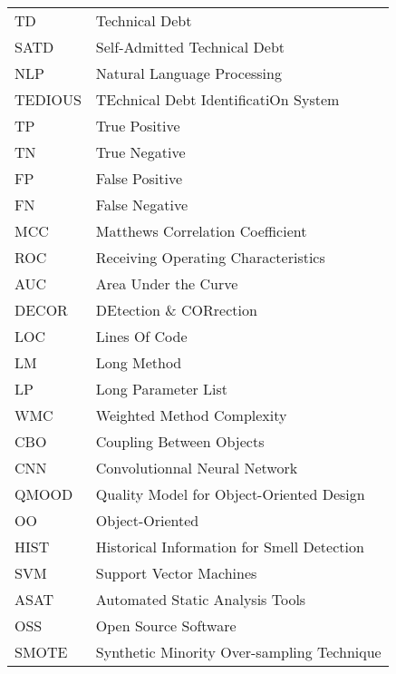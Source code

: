 \begin{longtable}{lp{5in}}
TD			    & Technical Debt\\
SATD		 & Self-Admitted Technical Debt\\
NLP			   & Natural Language Processing\\
TEDIOUS	   & TEchnical Debt IdentificatiOn System\\
TP				& True Positive\\
TN				& True Negative\\
FP				& False Positive\\
FN				& False Negative\\
MCC			  & Matthews Correlation Coefficient\\
ROC			  & Receiving Operating Characteristics\\
AUC			  & Area Under the Curve\\
DECOR	    & DEtection \& CORrection\\
LOC			   & Lines Of Code\\
LM				& Long Method\\
LP				 & Long Parameter List\\
WMC			 & Weighted Method Complexity\\
CBO			  & Coupling Between Objects\\
CNN			  & Convolutionnal Neural Network\\
QMOOD	   & Quality Model for Object-Oriented Design\\
OO			   & Object-Oriented\\
HIST		   & Historical Information for Smell Detection\\
SVM			  & Support Vector Machines\\
ASAT		  & Automated Static Analysis Tools\\
OSS			   & Open Source Software\\
SMOTE		& Synthetic Minority Over-sampling Technique
\end{longtable}

